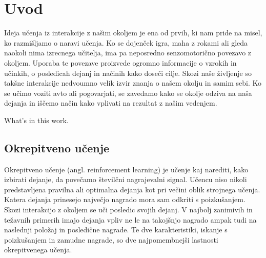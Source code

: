 \documentclass[a4paper, oneside, 12pt]{article}
\begin{document}
\listoffigures
\newpage



\section{Uvod}
Ideja učenja iz interakcije z našim okoljem je ena od prvih, ki nam pride na misel, ko razmišljamo o naravi učenja. Ko se dojenček igra, maha z rokami ali gleda naokoli nima izrecnega učitelja, ima pa neposredno senzomotorično povezavo z okoljem. Uporaba te povezave proizvede ogromno informacije o vzrokih in učinkih, o posledicah dejanj in načinih kako doseči cilje. Skozi naše življenje so takšne interakcije nedvoumno velik izvir znanja o našem okolju in samim sebi. Ko se učimo voziti avto ali pogovarjati, se zavedamo kako se okolje odziva na naša dejanja in iščemo način kako vplivati na rezultat z našim vedenjem.

What's in this work.

\subsection{Okrepitveno učenje}
Okrepitveno učenje (angl. reinforcement learning) je učenje kaj narediti, kako izbirati dejanje, da povečamo številčni nagrajevalni signal. Učencu niso nikoli predstavljena pravilna ali optimalna dejanja kot pri večini oblik strojnega učenja. Katera dejanja prinesejo največjo nagrado mora sam odkriti s poizkušanjem. Skozi interakcijo z okoljem se uči posledic svojih dejanj. V najbolj zanimivih in težavnih primerih imajo dejanja vpliv ne le na takojšnjo nagrado ampak tudi na naslednji položaj in posledične nagrade. Te dve karakteristiki, iskanje s poizkušanjem in zamudne nagrade, so dve najpomembnejši lastnosti okrepitvenega učenja.
\end{document}
